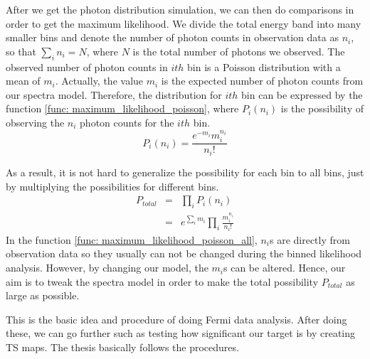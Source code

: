 \documentclass[12pt]{report}
\begin{document}
          After we get the photon distribution simulation, we can then do comparisons in order to get 
          the maximum likelihood. We divide the total energy band into many smaller bins and denote
          the number of photon counts in observation data as $n_{i}$, so that $\sum_{i}^{}n_{i} = N$, 
          where $N$ is the total number of photons we observed. The observed number of photon counts
          in $ith$ bin is a Poisson distribution with a mean of $m_{i}$. Actually, the value $m_{i}$ is the 
          expected number of photon counts from our spectra model. Therefore, the distribution for $ith$ bin
          can be expressed by the function \ref{func: maximum_likelihood_poisson}, where 
          $P_{i}\left(n_{i}\right)$ is the possibility of observing the $n_{i}$ photon counts for the $ith$
          bin. 
          \begin{equation}
            P_{i}\left(n_{i}\right) = \frac{e^{-m_{i}} m_{i}^{n_{i}}}{n_{i}!}
            \label{func: maximum_likelihood_poisson}
          \end{equation}

          As a result, it is not hard to generalize the possibility for each bin to all bins, just 
          by multiplying the possibilities for different bins.
          \begin{eqnarray}
            P_{total} &=& \prod_{i}^{}P_{i}\left(n_{i}\right) \nonumber \\ 
                      &=& e^{\sum_{i}^{}m_i}\prod_{i}^{}\frac{m_{i}^{n_i}}{n_i!}
            \label{func: maximum_likelihood_poisson_all}
          \end{eqnarray}
          In the function \ref{func: maximum_likelihood_poisson_all}, $n_i$s are directly 
          from observation data so they usually can not be changed during the binned likelihood 
          analysis. However, by changing our model, the $m_i$s can be altered. 
          Hence, our aim is to tweak the spectra model in order to make the total possibility 
          $P_{total}$ as large as possible. 

          This is the basic idea and procedure of doing Fermi data analysis. After doing these,
          we can go further such as testing how significant our target is by creating TS maps. The 
          thesis basically follows the procedures. 
\end{document}
